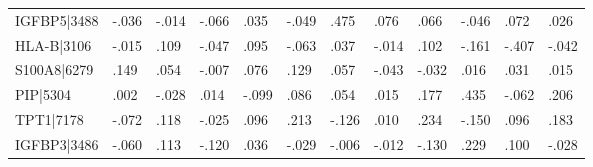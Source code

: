 \begin{table}[h]
\begin{tabular}{llllllllllll}
IGFBP5|3488                     & -.036                            & -.014                            & -.066                            & .035                             & -.049                            & .475                             & .076                             & .066                             & -.046                            & .072                              & .026                              \\
HLA-B|3106                      & -.015                            & .109                             & -.047                            & .095                             & -.063                            & .037                             & -.014                            & .102                             & -.161                            & -.407                             & -.042                             \\
S100A8|6279                     & .149                             & .054                             & -.007                            & .076                             & .129                             & .057                             & -.043                            & -.032                            & .016                             & .031                              & .015                              \\
PIP|5304                        & .002                             & -.028                            & .014                             & -.099                            & .086                             & .054                             & .015                             & .177                             & .435                             & -.062                             & .206                              \\
TPT1|7178                       & -.072                            & .118                             & -.025                            & .096                             & .213                             & -.126                            & .010                             & .234                             & -.150                            & .096                              & .183                              \\
IGFBP3|3486                     & -.060                            & .113                             & -.120                            & .036                             & -.029                            & -.006                            & -.012                            & -.130                            & .229                             & .100                              & -.028                            \\ \hline
\end{tabular}
\end{table}



